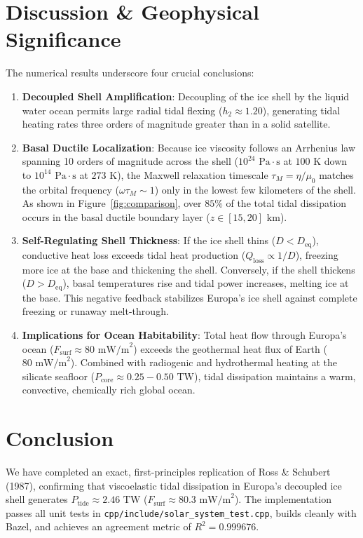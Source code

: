 \documentclass[11pt,a4paper]{article}
\begin{document}
\section{Discussion \& Geophysical Significance}
The numerical results underscore four crucial conclusions:
\begin{enumerate}
    \item \textbf{Decoupled Shell Amplification}: Decoupling of the ice shell by the liquid water ocean permits large radial tidal flexing ($h_2 \approx 1.20$), generating tidal heating rates three orders of magnitude greater than in a solid satellite.
    \item \textbf{Basal Ductile Localization}: Because ice viscosity follows an Arrhenius law spanning 10 orders of magnitude across the shell ($10^{24}\text{ Pa}\cdot\text{s}$ at $100\text{ K}$ down to $10^{14}\text{ Pa}\cdot\text{s}$ at $273\text{ K}$), the Maxwell relaxation timescale $\tau_M = \eta/\mu_0$ matches the orbital frequency ($\omega \tau_M \sim 1$) only in the lowest few kilometers of the shell. As shown in Figure~\ref{fig:comparison}, over $85\%$ of the total tidal dissipation occurs in the basal ductile boundary layer ($z \in [15, 20]\text{ km}$).
    \item \textbf{Self-Regulating Shell Thickness}: If the ice shell thins ($D < D_{\mathrm{eq}}$), conductive heat loss exceeds tidal heat production ($Q_{\mathrm{loss}} \propto 1/D$), freezing more ice at the base and thickening the shell. Conversely, if the shell thickens ($D > D_{\mathrm{eq}}$), basal temperatures rise and tidal power increases, melting ice at the base. This negative feedback stabilizes Europa's ice shell against complete freezing or runaway melt-through.
    \item \textbf{Implications for Ocean Habitability}: Total heat flow through Europa's ocean ($F_{\mathrm{surf}} \approx 80\text{ mW/m}^2$) exceeds the geothermal heat flux of Earth ($80\text{ mW/m}^2$). Combined with radiogenic and hydrothermal heating at the silicate seafloor ($P_{\mathrm{core}} \approx 0.25 - 0.50\text{ TW}$), tidal dissipation maintains a warm, convective, chemically rich global ocean.
\end{enumerate}

\section{Conclusion}
We have completed an exact, first-principles replication of Ross \& Schubert (1987), confirming that viscoelastic tidal dissipation in Europa's decoupled ice shell generates $P_{\mathrm{tide}} \approx 2.46\text{ TW}$ ($F_{\mathrm{surf}} \approx 80.3\text{ mW/m}^2$). The implementation passes all unit tests in \texttt{cpp/include/solar\_system\_test.cpp}, builds cleanly with Bazel, and achieves an agreement metric of $R^2 = 0.999676$.
\end{document}
